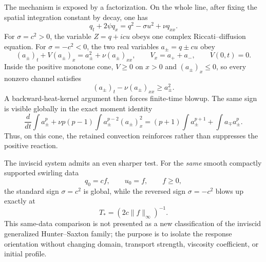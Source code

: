 \documentclass[11pt]{article}
\theoremstyle{definition}
\begin{document}
The mechanism is exposed by a factorization.  On the whole line, after fixing the spatial integration constant by decay, one has
\begin{equation}\label{eq:intro-q}
 q_t+2\psi q_x=q^2-\sigma u^2+\nu q_{xx}.
\end{equation}
For $\sigma=c^2>0$, the variable $Z=q+icu$ obeys one complex Riccati--diffusion equation.  For $\sigma=-c^2<0$, the two real variables $a_\pm=q\pm cu$ obey
\begin{equation}\label{eq:intro-split}
 (a_\pm)_t+V(a_\pm)_x=a_\pm^2+\nu(a_\pm)_{xx},
 \qquad V_x=a_++a_-,\qquad V(0,t)=0.
\end{equation}
Inside the positive monotone cone, $V\ge0$ on $x>0$ and $(a_\pm)_x\le0$, so every nonzero channel satisfies
\[
 (a_\pm)_t-\nu(a_\pm)_{xx}\ge a_\pm^2.
\]
A backward-heat-kernel argument then forces finite-time blowup.  The same sign is visible globally in the exact moment identity
\[
 \frac{d}{dt}\int a_\pm^p
 +\nu p(p-1)\int a_\pm^{p-2}(a_\pm)_x^2
 =(p+1)\int a_\pm^{p+1}+\int a_\mp a_\pm^p.
\]
Thus, on this cone, the retained convection reinforces rather than suppresses the positive reaction.

The inviscid system admits an even sharper test.  For the \emph{same} smooth compactly supported swirling data
\[
 q_0=cf,
 \qquad u_0=f,
 \qquad f\ge0,
\]
the standard sign $\sigma=c^2$ is global, while the reversed sign $\sigma=-c^2$ blows up exactly at
\[
 T_*=(2c\|f\|_\infty)^{-1}.
\]
This same-data comparison is not presented as a new classification of the inviscid generalized Hunter--Saxton family; the purpose is to isolate the response orientation without changing domain, transport strength, viscosity coefficient, or initial profile.
\end{document}
